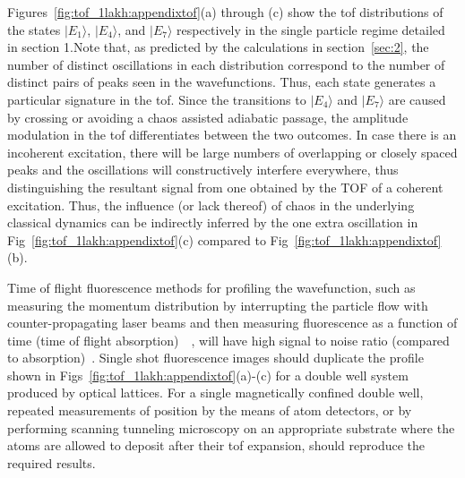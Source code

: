 Figures~\ref{fig:tof_1lakh:appendixtof}(a) through (c) show the tof distributions of the states $| E_1\rangle$, $| E_4\rangle$, and $| E_7\rangle$ respectively in the single particle regime detailed in section 1.Note that, as predicted by the calculations in section~\ref{sec:2}, the number of distinct oscillations in each distribution correspond to the number of distinct pairs of peaks seen in the wavefunctions. Thus, each state generates a particular signature in the tof. Since the transitions to $|E_4\rangle$   and $|E_7\rangle$ are caused by crossing or avoiding a chaos assisted adiabatic passage, the amplitude modulation in the tof differentiates between the two outcomes. In case there is an incoherent excitation, there will be large numbers of overlapping or closely spaced peaks and the oscillations will constructively interfere everywhere, thus distinguishing the resultant signal from one obtained by the TOF of a coherent excitation. Thus,  the influence (or lack thereof) of chaos in the underlying classical dynamics can be indirectly inferred by the one extra oscillation in Fig~\ref{fig:tof_1lakh:appendixtof}(c) compared to Fig~\ref{fig:tof_1lakh:appendixtof}(b).

Time of flight fluorescence methods for profiling the wavefunction, such as measuring the momentum distribution by interrupting the particle flow with counter-propagating laser beams and then measuring fluorescence as a function of time (time of flight absorption)~\cite{fluorescense}~\cite{fluorescense:web}, will have high signal to noise ratio (compared to absorption)~\cite{raizen}.  Single shot fluorescence images should duplicate the profile shown in Figs~\ref{fig:tof_1lakh:appendixtof}(a)-(c) for a double well system produced by optical lattices. For a single magnetically confined double well, repeated measurements of position by the means of atom detectors, or by performing scanning tunneling microscopy on an appropriate substrate where the atoms are allowed to deposit after their tof expansion, should reproduce the required results.
\pagebreak

